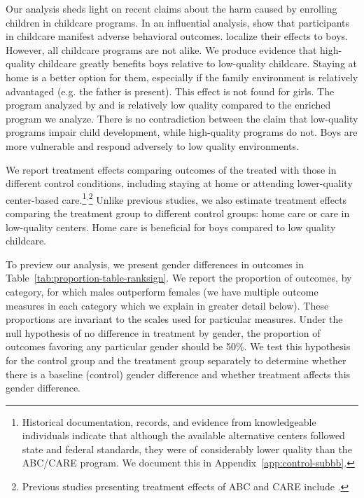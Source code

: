 Our analysis sheds light on recent claims about the harm caused by enrolling children in childcare programs. In an influential analysis, \citet{Baker_Gruber_etal_2008_JPE} show that participants in childcare manifest adverse behavioral outcomes. \citet{Kottelenberg-Lehrer_2014_Gender-Effects} localize their effects to boys. However, all childcare programs are not alike. We produce evidence that high-quality childcare greatly benefits boys relative to low-quality childcare. Staying at home is a better option for them, especially if the family environment is relatively advantaged (e.g. the father is present). This effect is not found for girls. The program analyzed by \citet{Baker_Gruber_Milligan_2015_Noncog_Defects} and \citet{Kottelenberg-Lehrer_2014_Gender-Effects} is relatively low quality compared to the enriched program we analyze. There is no contradiction between the claim that low-quality programs impair child development, while high-quality programs do not. Boys are more vulnerable and respond adversely to low quality environments.

We report treatment effects comparing outcomes of the treated with those in different control conditions, including staying at home or attending lower-quality center-based care.\footnote{Historical documentation, records, and evidence from knowledgeable individuals indicate that although the available alternative centers followed state and federal standards, they were of considerably lower quality than the ABC/CARE program. We document this in Appendix~\ref{app:control-subbb}.}$^,$\footnote{Previous studies presenting treatment effects of ABC and CARE include \citet{Ramey_etal_1985_Project-CARE_TiECSE,Clarke_Campbell_1998_ABC_Comparison_ECRQ,Campbell_Pungello_etal_2001_DP,Campbell_Ramey_etal_2002_ADS,Campbell_Wasik_etal_2008_ECRQ,Campbell_Conti_etal_2014_EarlyChildhoodInvestments}.} Unlike previous studies, we also estimate treatment effects comparing the treatment group to different control groups: home care or care in low-quality centers. Home care is beneficial for boys compared to low quality childcare.

To preview our analysis, we present gender differences in outcomes in Table~\ref{tab:proportion-table-ranksign}. We report the proportion of outcomes, by category, for which males outperform females (we have multiple outcome measures in each category which we explain in greater detail below). These proportions are invariant to the scales used for particular measures. Under the null hypothesis of no difference in treatment by gender, the proportion of outcomes favoring any particular gender should be 50\%. We test this hypothesis for the control group and the treatment group separately to determine whether there is a baseline (control) gender difference and whether treatment affects this gender difference.

